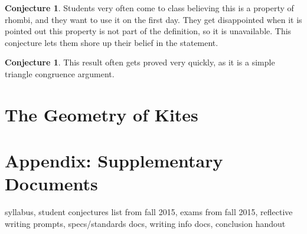 \documentclass{tufte-handout}
\theoremstyle{definition}
\newtheorem{conjecture}[problem]{Conjecture}
\begin{document}
\begin{conjecture}
Students very often come to class believing this is a property of rhombi, and they want to use it on the first day.
They get disappointed when it is pointed out this property is not part of the definition, so it is unavailable.
This conjecture lets them shore up their belief in the statement.
\end{conjecture}

\begin{conjecture}
This result often gets proved very quickly, as it is a simple triangle congruence argument.
\end{conjecture}

\clearpage
\section{The Geometry of Kites}


\clearpage
\section{Appendix: Supplementary Documents}

syllabus, student conjectures list from fall 2015, exams from fall 2015, reflective writing prompts, specs/standards docs, writing info docs, conclusion handout
\end{document}
